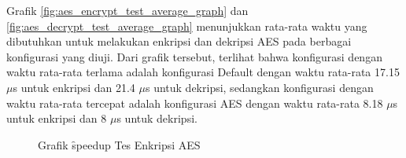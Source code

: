 Grafik \ref{fig:aes_encrypt_test_average_graph} dan \ref{fig:aes_decrypt_test_average_graph} menunjukkan rata-rata waktu yang dibutuhkan untuk melakukan enkripsi dan dekripsi AES pada berbagai konfigurasi yang diuji. Dari grafik tersebut, terlihat bahwa konfigurasi dengan waktu rata-rata terlama adalah konfigurasi Default dengan waktu rata-rata 17.15 $\mu$s untuk enkripsi dan 21.4 $\mu$s untuk dekripsi, sedangkan konfigurasi dengan waktu rata-rata tercepat adalah konfigurasi AES dengan waktu rata-rata 8.18 $\mu$s untuk enkripsi dan 8 $\mu$s untuk dekripsi.

\begin{figure}
    \centering
    \caption{Grafik \f{speedup} Tes Enkripsi AES}
    \label{fig:aes_encrypt_test_graph}
\end{figure}

